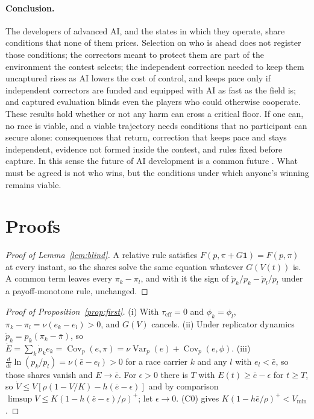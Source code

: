 \documentclass[letterpaper]{article} %
\theoremstyle{definition}
\newcommand{\Vmin}{V_{\min}}
\newcommand{\taueff}{\tau_{\mathrm{eff}}}
\begin{document}
\paragraph{Conclusion.} The developers of advanced AI, and the states in which they operate, share conditions that none of them prices. Selection on who is ahead does not register those conditions; the correctors meant to protect them are part of the environment the contest selects; the independent correction needed to keep them uncaptured rises as AI lowers the cost of control, and keeps pace only if independent correctors are funded and equipped with AI as fast as the field is; and captured evaluation blinds even the players who could otherwise cooperate. These results hold whether or not any harm can cross a critical floor. If one can, no race is viable, and a viable trajectory needs conditions that no participant can secure alone: consequences that return, correction that keeps pace and stays independent, evidence not formed inside the contest, and rules fixed before capture. In this sense the future of AI development is a common future \citep{wced1987}. What must be agreed is not who wins, but the conditions under which anyone's winning remains viable.



\appendix

\section{Proofs}\label{app:proofs}

\begin{proof}[Proof of Lemma~\ref{lem:blind}]
A relative rule satisfies $F(p,\pi+G\mathbf 1)=F(p,\pi)$ at every instant, so the shares solve the same equation whatever $G(V(t))$ is. A common term leaves every $\pi_k-\pi_l$, and with it the sign of $\dot p_k/p_k-\dot p_l/p_l$ under a payoff-monotone rule, unchanged.
\end{proof}

\begin{proof}[Proof of Proposition~\ref{prop:first}]
(i) With $\taueff=0$ and $\phi_k=\phi_l$, $\pi_k-\pi_l=\nu(e_k-e_l)>0$, and $G(V)$ cancels. (ii) Under replicator dynamics $\dot p_k=p_k(\pi_k-\bar\pi)$, so $\dot E=\sum_k\dot p_ke_k=\operatorname{Cov}_p(e,\pi)=\nu\operatorname{Var}_p(e)+\operatorname{Cov}_p(e,\phi)$. (iii) $\frac{d}{dt}\ln(p_k/p_l)=\nu(\bar e-e_l)>0$ for a race carrier $k$ and any $l$ with $e_l<\bar e$, so those shares vanish and $E\to\bar e$. For $\epsilon>0$ there is $T$ with $E(t)\ge\bar e-\epsilon$ for $t\ge T$, so $\dot V\le V[\rho(1-V/K)-h(\bar e-\epsilon)]$ and by comparison $\limsup V\le K(1-h(\bar e-\epsilon)/\rho)^+$; let $\epsilon\to0$. (C0) gives $K(1-h\bar e/\rho)^+<\Vmin$.
\end{proof}
\end{document}

